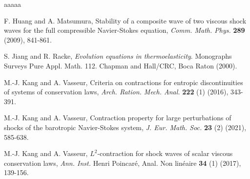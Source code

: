 \documentclass[10pt,reqno]{amsart}
\numberwithin{equation}{section}
\begin{document}
\begin{thebibliography}{aaaaa}

	



 F. Huang and A. Matsumura, Stability of a composite wave of two viscous shock waves for the full compressible Navier-Stokes equation, {\it Comm. Math. Phys.} {\bf 289} (2009), 841-861.




 S. Jiang and R. Racke, {\it Evolution equations in thermoelasticity}.  Monographs
Surveys Pure Appl. Math. 112. Chapman and Hall/CRC, Boca Raton (2000).

 M.-J. Kang and A. Vasseur, Criteria on contractions for entropic discontinuities of systems of conservation laws, {\it Arch. Ration. Mech. Anal.} {\bf 222} (1) (2016), 343-391.

 M.-J. Kang and A. Vasseur, Contraction property for large perturbations of shocks of the barotropic Navier-Stokes system, {\it J. Eur. Math. Soc.} {\bf 23} (2) (2021), 585-638.

  M.-J. Kang and A. Vasseur, $L^2$-contraction for shock waves of scalar viscous conservation laws, {\it Ann. Inst.} Henri Poincar\'{e}, Anal. Non lin\'{e}aire {\bf 34} (1) (2017), 139-156.


\end{thebibliography}
\end{document}

